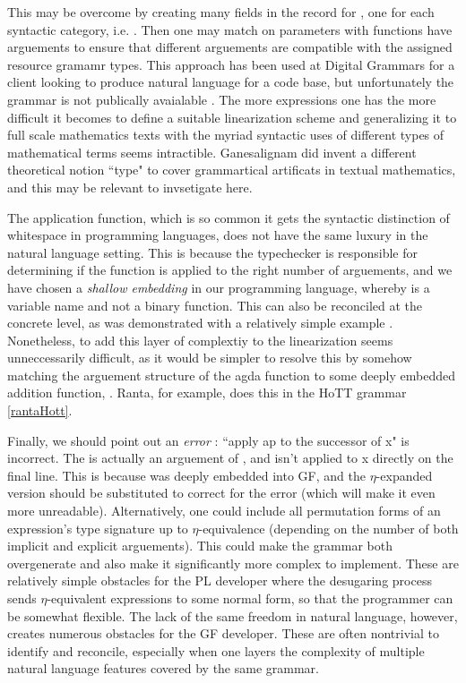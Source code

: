 This may be overcome by creating many fields in the record  for
, one for each syntactic category, i.e.
.
Then one may match on parameters
with functions have  arguements to ensure that different arguements
are compatible with the assigned resource gramamr types. This approach has been
used at Digital Grammars for a client looking to produce natural language for a
code base, but unfortunately the grammar is not publically avaialable
\cite{rantaZ}. The more expressions one has the more difficult it becomes to
define a suitable linearization scheme and generalizing it to full scale
mathematics texts with the myriad syntactic uses of different types of
mathematical terms seems intractible. Ganesalignam did invent a different
theoretical notion ``type" to cover grammartical artificats in textual
mathematics, and this may be relevant to invsetigate here.

The application function, which is so common it gets the syntactic distinction
of whitespace in programming languages, does not have the same luxury in the
natural language setting. This is because the typechecker is responsible for
determining if the function is applied to the right number of arguements, and we
have chosen a \emph{shallow embedding} in our programming language, whereby
 is a variable name and not a binary function. This can also be
reconciled at the concrete level, as was demonstrated with a relatively simple
example \cite{warrickPrec}. Nonetheless, to add this layer of complextiy to the
linearization seems unneccessarily difficult, as it would be simpler to resolve this by
somehow matching the arguement structure of the agda function to some deeply
embedded addition function, . Ranta, for
example, does this in the HoTT grammar \ref{rantaHott}.

Finally, we should point out an \emph{error} : ``apply ap to the successor of x" is
incorrect. The  is actually an arguement of , and isn't
applied to x directly on the final line. This is because
 was deeply embedded into GF, and the
$\eta$-expanded version should be
substituted to correct for the error (which will make it even more unreadable).
Alternatively, one could include all permutation forms of an expression's type
signature up to $\eta$-equivalence (depending on the number of both implicit and
explicit arguements). This could make the grammar both overgenerate and also
make it significantly more complex to implement. These are relatively simple
obstacles for the PL developer where the desugaring process sends
$\eta$-equivalent expressions to some normal form, so that the programmer can be
somewhat flexible. The lack of the same freedom in natural language, however,
creates numerous obstacles for the GF developer. These are often nontrivial to
identify and reconcile, especially when one layers the complexity of multiple
natural language features covered by the same grammar.
